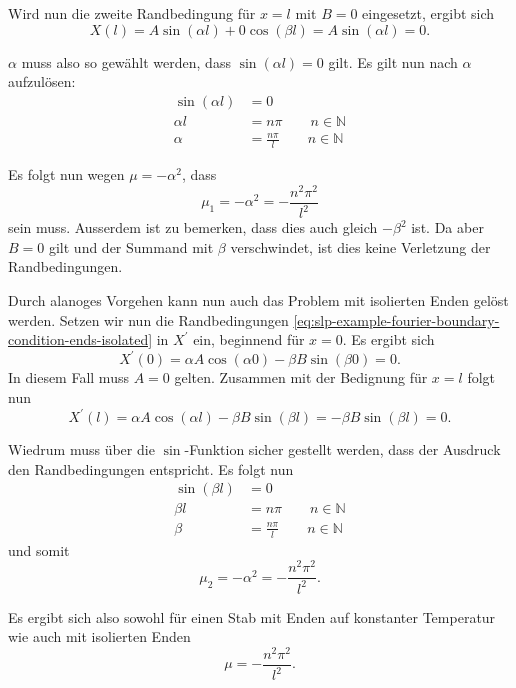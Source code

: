 Wird nun die zweite Randbedingung für $x = l$ mit $B = 0$ eingesetzt, ergibt
sich
\[
    X(l)
    =
    A \sin(\alpha l) + 0 \cos(\beta l)
    =
    A \sin(\alpha l)
    = 0.
\]

$\alpha$ muss also so gewählt werden, dass $\sin(\alpha l) = 0$ gilt.
Es gilt nun nach $\alpha$ aufzulösen:
\[
\begin{aligned}
    \sin(\alpha l) &= 0 \\
    \alpha l &= n \pi \qquad n \in \mathbb{N} \\
    \alpha &= \frac{n \pi}{l} \qquad n \in \mathbb{N}
\end{aligned}
\]

Es folgt nun wegen $\mu = -\alpha^{2}$, dass
\begin{equation}
    \mu_1 = -\alpha^{2} = -\frac{n^{2}\pi^{2}}{l^{2}}
\end{equation}
sein muss.
Ausserdem ist zu bemerken, dass dies auch gleich $-\beta^{2}$ ist.
Da aber $B = 0$ gilt und der Summand mit $\beta$ verschwindet, ist dies keine
Verletzung der Randbedingungen.

Durch alanoges Vorgehen kann nun auch das Problem mit isolierten Enden gelöst
werden.
Setzen wir nun die Randbedingungen
\eqref{eq:slp-example-fourier-boundary-condition-ends-isolated} in $X^{\prime}$
ein, beginnend für $x = 0$. Es ergibt sich
\[
    X^{\prime}(0)
    =
    \alpha A \cos(\alpha 0) - \beta B \sin(\beta 0)
    = 0.
\]
In diesem Fall muss $A = 0$ gelten.
Zusammen mit der Bedignung für $x = l$
folgt nun
\[
    X^{\prime}(l)
    =
    \alpha A \cos(\alpha l) - \beta B \sin(\beta l)
    =
    -\beta B \sin(\beta l)
    = 0.
\]

Wiedrum muss über die $\sin$-Funktion sicher gestellt werden, dass der Ausdruck
den Randbedingungen entspricht. Es folgt nun
\[
\begin{aligned}
    \sin(\beta l) &= 0 \\
    \beta l &= n \pi \qquad n \in \mathbb{N} \\
    \beta &= \frac{n \pi}{l} \qquad n \in \mathbb{N}
\end{aligned}
\]
und somit
\[
    \mu_2 = -\alpha^{2} = -\frac{n^{2}\pi^{2}}{l^{2}}.
\]

Es ergibt sich also sowohl für einen Stab mit Enden auf konstanter Temperatur
wie auch mit isolierten Enden
\begin{equation}
    \label{eq:slp-example-fourier-mu-solution}
    \mu
    =
    -\frac{n^{2}\pi^{2}}{l^{2}}.
\end{equation}



